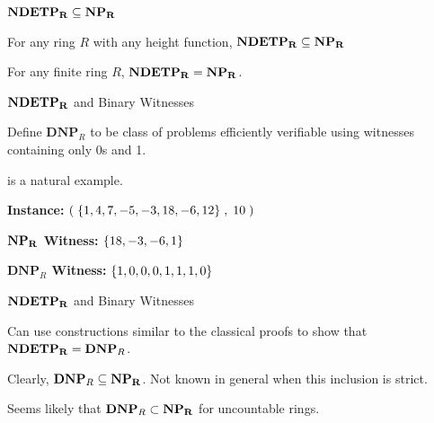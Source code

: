 \documentclass[c]{beamer}
\begin{document}
\begin{frame}{$\mathbf{NDETP_R} \subseteq \mathbf{NP_R}$}
  
  \begin{theorem}
    For any ring $R$ with any height function, $\mathbf{NDETP_R} \subseteq \mathbf{NP_R}$
  \end{theorem}
  
  \pause
  \vspace{\baselineskip}

  \begin{theorem}
    For any finite ring $R$, $\mathbf{NDETP_R} = \mathbf{NP_R}$.
  \end{theorem}
  
\end{frame}

\begin{frame}{$\mathbf{NDETP_R}$ and Binary Witnesses}

  Define $\mathbf{DNP}_R$ to be class of problems efficiently
  verifiable using witnesses containing only 0s and 1.\pause

  \vspace{\baselineskip}

  \subsum{} is a natural example.\pause
  
  \vspace{\baselineskip}

  \textbf{Instance:} $(\;\{1,4,7,-5,-3,18,-6,12\}\;, \;10\;)$

  \textbf{$\mathbf{NP_R}$ Witness:}  $\{18, -3, -6, 1\}$
  
  \textbf{$\mathbf{DNP}_R$ Witness:}  $\{1,0,0,0,1,1,1,0\}$
\end{frame}

\begin{frame}{$\mathbf{NDETP_R}$ and Binary Witnesses}

  Can use constructions similar to the classical proofs to show that
  $\mathbf{NDETP_R} = \mathbf{DNP}_R$.\pause

  \vspace{\baselineskip}

  Clearly, $\mathbf{DNP}_R \subseteq \mathbf{NP_R}$.  Not known in general when
  this inclusion is strict.\pause

  \vspace{\baselineskip}

  Seems likely that $\mathbf{DNP}_R \subset \mathbf{NP_R}$ for uncountable
  rings.
  
\end{frame}
\end{document}
